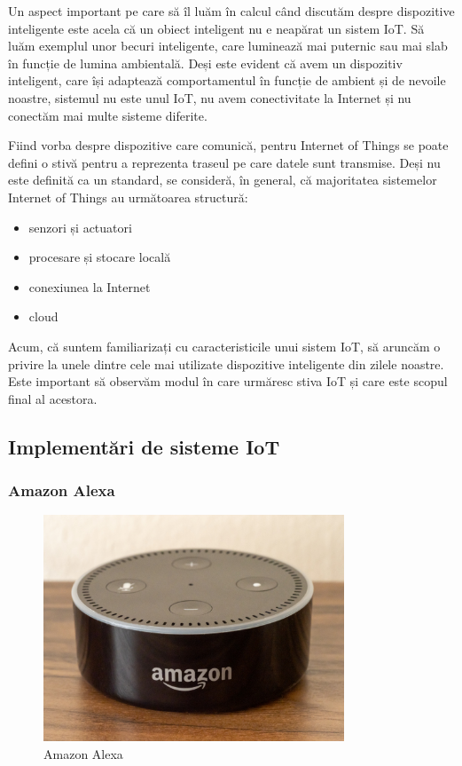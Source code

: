 Un aspect important pe care să îl luăm în calcul când discutăm despre
dispozitive inteligente este acela că un obiect inteligent nu e neapărat un
sistem IoT. Să luăm exemplul unor becuri inteligente, care luminează mai
puternic sau mai slab în funcție de lumina ambientală. Deși este evident că avem
un dispozitiv inteligent, care își adaptează comportamentul în funcție de
ambient și de nevoile noastre, sistemul nu este unul IoT, nu avem conectivitate
la Internet și nu conectăm mai multe sisteme diferite.

Fiind vorba despre dispozitive care comunică, pentru Internet of Things se poate
defini o stivă pentru a reprezenta traseul pe care datele sunt transmise. Deși
nu este definită ca un standard, se consideră, în general, că majoritatea
sistemelor Internet of Things au următoarea structură:

\begin{itemize}
  \item senzori și actuatori
  \item procesare și stocare locală
  \item conexiunea la Internet
  \item cloud
\end{itemize}

Acum, că suntem familiarizați cu caracteristicile unui sistem IoT, să aruncăm o
privire la unele dintre cele mai utilizate dispozitive inteligente din zilele
noastre. Este important să observăm modul în care urmăresc stiva IoT și care
este scopul final al acestora.

\subsection{Implementări de sisteme IoT}
\label{sec:embed:iot:impl}

\subsubsection{Amazon Alexa}
\label{sec:embed:iot:impl:alexa}

\begin{figure}[!htbp]
  \centering
  \includegraphics[width=0.8\textwidth]{chapters/15-embed/img/alexa.jpg}
  \caption{Amazon Alexa}
  \label{fig:embed:alexa}
\end{figure}

